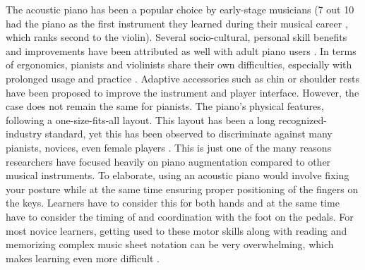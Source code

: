 \documentclass[sigconf, screen, review]{acmart}
\begin{document}
The acoustic piano has been a popular choice by early-stage musicians (7 out 10 had the piano as the first instrument they learned during their musical career \cite{sloboda1992transitions}, which ranks second to the violin). Several socio-cultural, personal skill benefits and improvements have been attributed as well with adult piano users \cite{jutras2006benefits}. In terms of ergonomics, pianists and violinists share their own difficulties, especially with prolonged usage and practice \cite{chi2020ergonomics}. Adaptive accessories such as chin or shoulder rests have been proposed to improve the instrument and player interface. However, the case does not remain the same for pianists. The piano's physical features, following a one-size-fits-all layout. This layout has been a long recognized-industry standard, yet this has been observed to discriminate against many pianists, novices, even female players \cite{boyle2012experience}. This is just one of the many reasons researchers have focused heavily on piano augmentation compared to other musical instruments. To elaborate, using an acoustic piano would involve fixing your posture while at the same time ensuring proper positioning of the fingers on the keys. Learners have to consider this for both hands and at the same time have to consider the timing of and coordination with the foot on the pedals. For most novice learners, getting used to these motor skills along with reading and memorizing complex music sheet notation can be very overwhelming, which makes learning even more difficult \cite{highben2004effects}. 

\end{document}
